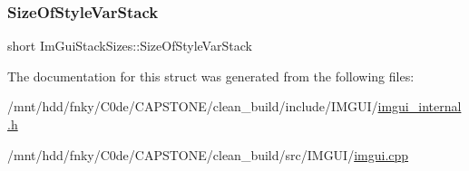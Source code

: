 \subsubsection{\texorpdfstring{Size\+Of\+Style\+Var\+Stack}{SizeOfStyleVarStack}}
{\footnotesize\ttfamily short Im\+Gui\+Stack\+Sizes\+::\+Size\+Of\+Style\+Var\+Stack}



The documentation for this struct was generated from the following files\+:\begin{DoxyCompactItemize}
\item 
/mnt/hdd/fnky/\+C0de/\+C\+A\+P\+S\+T\+O\+N\+E/clean\+\_\+build/include/\+I\+M\+G\+U\+I/\hyperlink{imgui__internal_8h}{imgui\+\_\+internal.\+h}\item 
/mnt/hdd/fnky/\+C0de/\+C\+A\+P\+S\+T\+O\+N\+E/clean\+\_\+build/src/\+I\+M\+G\+U\+I/\hyperlink{imgui_8cpp}{imgui.\+cpp}\end{DoxyCompactItemize}
